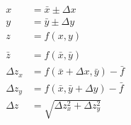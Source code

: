 \newcommand{\nom}[1]{\bar{#1}}
\newcommand{\unc}[1]{\Delta {#1}}
\newcommand{\upp}[1]{\nom{#1} + \unc{#1}}
\begin{align*}
x &= \nom{x} \pm \unc{x} \\
y &= \nom{y} \pm \unc{y} \\
z &= f(x,y) \\
\\
\nom{z} &= f(\nom{x},\nom{y}) \\
\unc{z}_x &= f(\upp{x},\nom{y}) - \nom{f} \\
\unc{z}_y &= f(\nom{x},\upp{y}) - \nom{f} \\
\unc{z} &= \sqrt{ \unc{z}_x^2 + \unc{z}_y^2 } \\
\end{align*}
